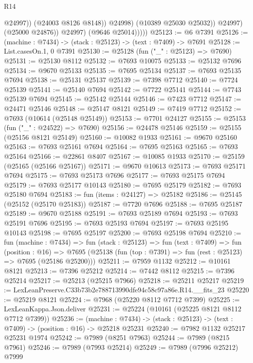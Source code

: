 \begin{lexlean}{R14}
\begin{coremodule}
                            @24997))
                        (@24003 @8126 @8148))
                      @24998)
                    (@10389 @25030 @25032))
                  @24997)
                (@25000 @24876))
              @24997)
            (@9646 @25014)))))
@25123 := @6 @7391
@25126 := (machine : @7434) -> (stack : @25123) -> (text : @7409) -> @7691
@25128 := List.casesOn.{1, 0} @7391
@25130 := @25128 (fun ("_" : @25123) => @7690)
@25131 := @25130 @8112
@25132 := @7693 @10075
@25133 := @25132 @7696
@25134 := @9670 @25133
@25135 := @7695 @25134
@25137 := @7693 @25135 @7694
@25138 := @25131 @25137
@25139 := @7398 @7712
@25140 := @7724 @25139
@25141 := @25140 @7694
@25142 := @7722 @25141
@25144 := @7743 @25139 @7694
@25145 := @25142 @25144
@25146 := @7423 @7712
@25147 := @24471 @25146
@25148 := @25147 @8121
@25149 := @7419 @7712
@25152 := @7693 (@10614 (@25148 @25149))
@25153 := @7701 @24127
@25155 := @25153 (fun ("_" : @24522) => @7690)
@25156 := @24478 @25146
@25159 := @25155 (@25156 @8121 @25149)
@25160 := @10082 @1933
@25161 := @9670 @25160
@25163 := @7693 @25161 @7694
@25164 := @7695 @25163
@25165 := @7693 @25164
@25166 := @22861 @8407
@25167 := @10085 @1933
@25170 := @25159 (@25165 (@25166 @25167))
@25171 := @9670 @10613
@25173 := @7693 @25171 @7694
@25175 := @7693 @25173 @7696
@25177 := @7693 @25175 @7694
@25179 := @7693 @25177 @10143
@25180 := @7695 @25179
@25182 := @7693 @25180 @7694
@25183 := fun (items : @24127) => @25182
@25186 := @25145 (@25152 (@25170 @25183))
@25187 := @7720 @7696
@25188 := @7695 @25187
@25189 := @9670 @25188
@25191 := @7693 @25189 @7694
@25193 := @7693 @25191 @7696
@25195 := @7693 @25193 @7694
@25197 := @7693 @25195 @10143
@25198 := @7695 @25197
@25200 := @7693 @25198 @7694
@25210 := fun (machine : @7434) =>
  fun (stack : @25123) =>
  fun (text : @7409) =>
  fun (position : @16) =>
  @7695 (@25138 (fun (top : @7391) => fun (rest : @25123) => @7695 (@25186 @25200)))
@25211 := @7959 @1132
@25212 := @10161 @8121
@25213 := @7396 @25212
@25214 := @7442 @8112
@25215 := @7396 @25214
@25217 := @25213 (@25215 @7966)
@25218 := @25211 @25217
@25219 := LexLeanPreserve.C33b73b2e788713990dfe94c58c97a86e.R14.__fits_23
@25220 := @25219 @8121
@25224 := @7968 (@25220 @8112 @7712 @7399)
@25225 := LexLeanKappa.Json.deliver
@25231 := @25224 (@10161 (@25225 @8121 @8112 @7712 @7399))
@25236 := (machine : @7434) ->
  (stack : @25123) -> (text : @7409) -> (position : @16) -> @25218 @25231
@25240 := @7982 @1132 @25217 @25231 @1974
@25242 := @7989 (@8251 @7963)
@25244 := @7989 (@8215 @7961)
@25246 := @7989 (@7993 @25214)
@25249 := @7989 (@7996 @25212) @7999

\end{coremodule}
\end{lexlean}
